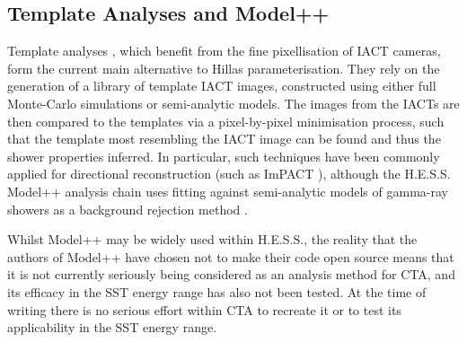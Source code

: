 \subsection{Template Analyses and Model++}
Template analyses \cite{cat}\cite{3danalysis}\cite{model++}\cite{impact}, which benefit from the fine pixellisation of IACT cameras, form the current main alternative to Hillas parameterisation. They rely on the generation of a library of template IACT images, constructed using either full Monte-Carlo simulations or semi-analytic models. The images from the IACTs are then compared to the templates via a pixel-by-pixel minimisation process, such that the template most resembling the IACT image can be found and thus the shower properties inferred. In particular, such techniques have been commonly applied for directional reconstruction (such as ImPACT \cite{impact}), although the H.E.S.S. Model++ analysis chain uses fitting against semi-analytic models of gamma-ray showers as a background rejection method \cite{model++}.

Whilst Model++ may be widely used within H.E.S.S., the reality that the authors of Model++ have chosen not to make their code open source means that it is not currently seriously being considered as an analysis method for CTA, and its efficacy in the SST energy range has also not been tested. At the time of writing there is no serious effort within CTA to recreate it or to test its applicability in the SST energy range.

